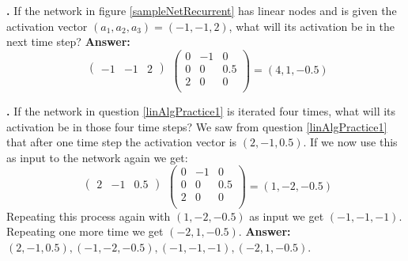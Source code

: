 \noindent
{}
{\bf \theLinearAlgebraCounter.}  If the network in figure \ref{sampleNetRecurrent} has linear nodes and is given the activation vector $(a_1,a_2,a_3) = (-1,-1,2)$, what will its activation be in the next time step?
{\bf Answer:} 
\[
  \begin{matrix}\begin{pmatrix}-1 & -1 & 2\end{pmatrix}\\\mbox{}\end{matrix}
 \begin{pmatrix}
 0  &   -1 & 0 \\
 0  &   0 & 0.5 \\
 2  &   0 & 0 \\
\end{pmatrix}
  =  (4,1,-0.5)
\]
\bigskip


\noindent
{}
{\bf \theLinearAlgebraCounter.}  If the network in question \ref{linAlgPractice1} is iterated four times, what will its activation be in those four time steps?
We saw from question \ref{linAlgPractice1} that after one time step the activation vector is $(2,-1,0.5)$. If we now use this as input to the network again we get:
\[
  \begin{matrix}
  \begin{pmatrix}2 & -1 & 0.5
  \end{pmatrix}\\\mbox{}
 \end{matrix}
 \begin{pmatrix}
 0  &   -1 & 0 \\
 0  &   0 & 0.5 \\
 2  &   0 & 0 \\
\end{pmatrix}
  =  (1,-2,-0.5)
\]
Repeating this process again with $(1,-2,-0.5)$ as input we get $(-1,-1,-1)$. Repeating one more time we get $(-2,1,-0.5)$.
{\bf Answer:}  $(2,-1,0.5),(-1,-2,-0.5),(-1,-1,-1),(-2,1,-0.5)$.
\bigskip
